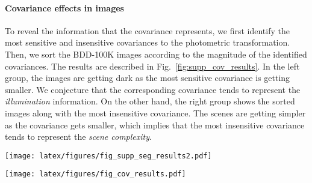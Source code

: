 \documentclass[final]{latex/cvpr}
\begin{document}
\vspace*{-0.4cm}
\paragraph{Covariance effects in images}
To reveal the information that the covariance represents, 
we first identify the most sensitive and insensitive covariances to the photometric transformation. Then, we sort the BDD-100K images according to the magnitude of the identified covariances.
The results are described in Fig.~\ref{fig:supp_cov_results}. In the left group, the images are getting dark as the most sensitive covariance is getting smaller. We conjecture that the corresponding covariance tends to represent the \emph{illumination} information. On the other hand, the right group shows the sorted images along with the most insensitive covariance. The scenes are getting simpler as the covariance gets smaller, which implies that the most insensitive covariance tends to represent the \textit{scene complexity}.





\begin{figure*}[!t]
\vspace*{-0.3cm}
\centering
  \texttt{[image: latex/figures/fig\_supp\_seg\_results2.pdf]}
  \caption{Segmentation results under various circumstances in BDD-100K with the models trained on Cityscapes. Circumstances include adverse weather conditions (\textit{i.e.,} snow and fog), unseen structures (\textit{i.e.,} parking lot and overpass), and vegetation.}
\label{fig:supp_seg_result_various}
\vspace*{-0.3cm}
\end{figure*}

\begin{figure*}[!t]
\centering
  \texttt{[image: latex/figures/fig\_cov\_results.pdf]}
\caption{Tendency of images in BDD-100K dataset along with the covariance changes.}
\label{fig:supp_cov_results}
\vspace*{+1.0cm}
\end{figure*}
\end{document}
